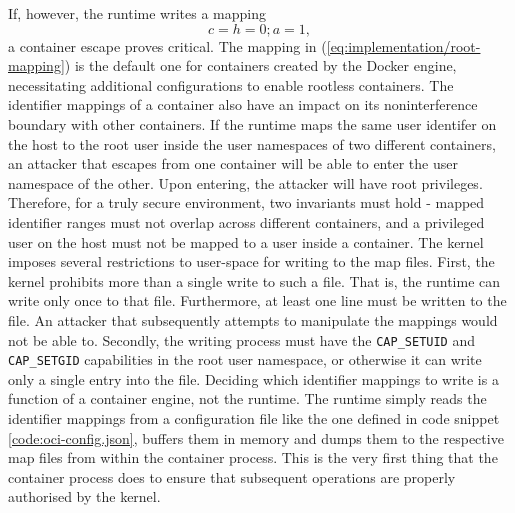 If, however, the runtime writes a mapping
\begin{equation}
    c = h = 0;  a = 1, \label{eq:implementation/root-mapping}
\end{equation}
a container escape proves critical.
The mapping in (\ref{eq:implementation/root-mapping}) is the default one for containers created by the Docker engine, necessitating
additional configurations to enable rootless containers.
The identifier mappings of a container also have an impact on its noninterference boundary with 
other containers. If the runtime maps the same user identifer on the host to the root user inside the user namespaces of two different containers, an 
attacker that escapes from one container will be able to enter the user namespace of the other. Upon entering,
the attacker will have root privileges. Therefore, for a truly secure environment, two invariants must hold - 
mapped identifier ranges must not overlap across different containers, and a privileged user on the host must 
not be mapped to a user inside a container. The kernel imposes several restrictions to user-space for 
writing to the map files. First, the kernel prohibits more than a single write to such a file. 
That is, the runtime can write only once to that file. Furthermore, at least one line must be 
written to the file. An attacker that subsequently attempts to manipulate the mappings would not 
be able to. Secondly, the writing process must have the \verb|CAP_SETUID| and 
\verb|CAP_SETGID| capabilities in the root user namespace, or otherwise it can 
write only a single entry into the file. Deciding which identifier mappings to write is a function 
of a container engine, not the runtime. The runtime simply reads the identifier mappings
from a configuration file like the one defined in code snippet \ref{code:oci-config.json}, buffers 
them in memory and dumps them to the respective map files from within the container process.
This is the very first thing that the container process does to ensure that subsequent operations
are properly authorised by the kernel. 

